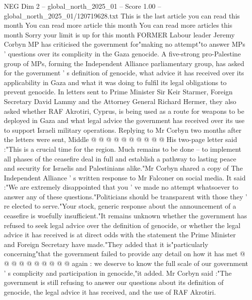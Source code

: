 \begin{textsample}{NEG Dim 2 – global\_north\_2025\_01 – Score 1.00 – global\_north\_2025\_01/120719628.txt}  \label{ex:f2_neg_047}
This is the last article you can read this month You can read more article this month You can read more articles this month Sorry your limit is up for this month FORMER Labour leader Jeremy Corbyn MP has criticised the government for"making no attempt"to answer MPs ' questions over its complicity in the Gaza genocide.
A five-strong pro-Palestine group of MPs, forming the Independent Alliance parliamentary group, has asked for the government ' s definition of genocide, what advice it has received over its applicability in Gaza and what it was doing to fulfil its legal obligations to prevent genocide.
In letters sent to Prime Minister Sir Keir Starmer, Foreign Secretary David Lammy and the Attorney General Richard Hermer, they also asked whether RAF Akrotiri, Cyprus, is being used as a route for weapons to be deployed in Gaza and what legal advice the government has received over its use to support Israeli military operations.
Replying to Mr Corbyn two months after the letters were sent, Middle @ @ @ @ @ @ @ @ @ @ His two-page letter said :"This is a crucial time for the region.
Much remains to be done -- to implement all phases of the ceasefire deal in full and establish a pathway to lasting peace and security for Israelis and Palestinians alike."Mr Corbyn shared a copy of The Independent Alliance ' s written response to Mr Falconer on social media.
It said :"We are extremely disappointed that you ' ve made no attempt whatsoever to answer any of these questions."Politicians should be transparent with those they ' re elected to serve."Your stock, generic response about the announcement of a ceasefire is woefully insufficient."It remains unknown whether the government has refused to seek legal advice over the definition of genocide, or whether the legal advice it has received is at direct odds with the statement the Prime Minister and Foreign Secretary have made."They added that it is"particularly concerning"that the government failed to provide any detail on how it has met @ @ @ @ @ @ @ @ @ @ again : we deserve to know the full scale of our government ' s complicity and participation in genocide,"it added.
Mr Corbyn said :"The government is still refusing to answer our questions about its definition of genocide, the legal advice it has received, and the use of RAF Akrotiri.

\end{textsample}
